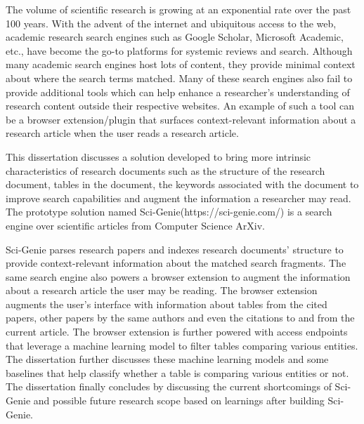 The volume of scientific research is growing at an exponential rate over the past 100 years. 
With the advent of the internet and ubiquitous access to the web, academic research search engines such as Google Scholar, Microsoft Academic, etc., have become the go-to platforms for systemic reviews and search.  Although many academic search engines host lots of content, they provide minimal context about where the search terms matched. 
Many of these search engines also fail to provide additional tools which can help enhance a researcher's understanding of research content outside their respective websites.
An example of such a tool can be a browser extension/plugin that surfaces context-relevant information about a research article when the user reads a research article.   

This dissertation discusses a solution developed to bring more intrinsic characteristics of research documents such as the structure of the research document, tables in the document,  the keywords associated with the document to improve search capabilities and augment the information a researcher may read.  The prototype solution named Sci-Genie(https://sci-genie.com/) is a search engine over scientific articles from Computer Science ArXiv.

Sci-Genie parses research papers and indexes research documents’ structure to provide context-relevant information about the matched search fragments. The same search engine also powers a browser extension to augment the information about a research article the user may be reading. The browser extension augments the user's interface with information about tables from the cited papers, other papers by the same authors and even the citations to and from the current article. The browser extension is further powered with access endpoints that leverage a machine learning model to filter tables comparing various entities. 
The dissertation further discusses these machine learning models and some baselines that help classify whether a table is comparing various entities or not.  
The dissertation finally concludes by discussing the current shortcomings of Sci-Genie and possible future research scope based on learnings after building Sci-Genie.

